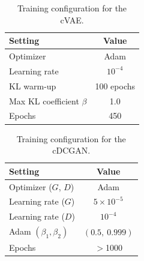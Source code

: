 \documentclass{article}
\begin{document}
\begin{table}[H]
\centering
\begin{tabular}{lc}
\toprule
\textbf{Setting} & \textbf{Value} \\
\midrule
Optimizer & Adam \\
Learning rate & $10^{-4}$ \\
KL warm-up & 100 epochs \\
Max KL coefficient $\beta$ & 1.0 \\
Epochs & 450 \\
\bottomrule
\end{tabular}
\caption{Training configuration for the cVAE.}
\label{tab:cvae_training}
\end{table}

\begin{table}[H]
\centering
\begin{tabular}{lc}
\toprule
\textbf{Setting} & \textbf{Value} \\
\midrule
Optimizer ($G$, $D$) & Adam \\
Learning rate ($G$) & $5{\times}10^{-5}$ \\
Learning rate ($D$) & $10^{-4}$ \\
Adam $(\beta_1, \beta_2)$ & $(0.5,\ 0.999)$ \\
Epochs & $>$1000\\
\bottomrule
\end{tabular}
\caption{Training configuration for the cDCGAN.}
\label{tab:dcgan_training}
\end{table}
\end{document}

